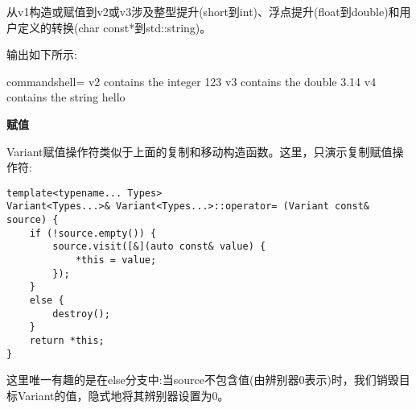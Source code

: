 从v1构造或赋值到v2或v3涉及整型提升(short到int)、浮点提升(float到double)和用户定义的转换(char const*到std::string)。

输出如下所示:

\begin{tcblisting}{commandshell={}}
v2 contains the integer 123
v3 contains the double 3.14
v4 contains the string hello
\end{tcblisting}

\noindent
\textbf{赋值}

Variant赋值操作符类似于上面的复制和移动构造函数。这里，只演示复制赋值操作符:

\begin{lstlisting}[style=styleCXX]
template<typename... Types>
Variant<Types...>& Variant<Types...>::operator= (Variant const& source) {
	if (!source.empty()) {
		source.visit([&](auto const& value) {
			*this = value;
		});
	}
	else {
		destroy();
	}
	return *this;
}
\end{lstlisting}

这里唯一有趣的是在else分支中:当source不包含值(由辨别器0表示)时，我们销毁目标Variant的值，隐式地将其辨别器设置为0。


















